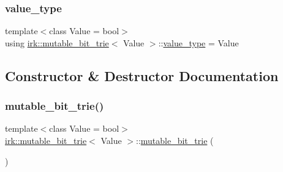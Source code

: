 \subsubsection{\texorpdfstring{value\+\_\+type}{value\_type}}
{\footnotesize\ttfamily template$<$class Value = bool$>$ \\
using \mbox{\hyperlink{classirk_1_1mutable__bit__trie}{irk\+::mutable\+\_\+bit\+\_\+trie}}$<$ Value $>$\+::\mbox{\hyperlink{classirk_1_1mutable__bit__trie_a398f85c4065b746e6ab10842981a9bf4}{value\+\_\+type}} =  Value}



\subsection{Constructor \& Destructor Documentation}
\mbox{\label{classirk_1_1mutable__bit__trie_a6927e834f866c053925d9ddf902774c1}} 
\subsubsection{\texorpdfstring{mutable\+\_\+bit\+\_\+trie()}{mutable\_bit\_trie()}\hspace{0.1cm}{\footnotesize\ttfamily [1/3]}}
{\footnotesize\ttfamily template$<$class Value = bool$>$ \\
\mbox{\hyperlink{classirk_1_1mutable__bit__trie}{irk\+::mutable\+\_\+bit\+\_\+trie}}$<$ Value $>$\+::\mbox{\hyperlink{classirk_1_1mutable__bit__trie}{mutable\+\_\+bit\+\_\+trie}} (\begin{DoxyParamCaption}{ }\end{DoxyParamCaption})\hspace{0.3cm}{\ttfamily [inline]}}

\mbox{\label{classirk_1_1mutable__bit__trie_a25fac71898d72afb04fc581ee5a913e7}} 

